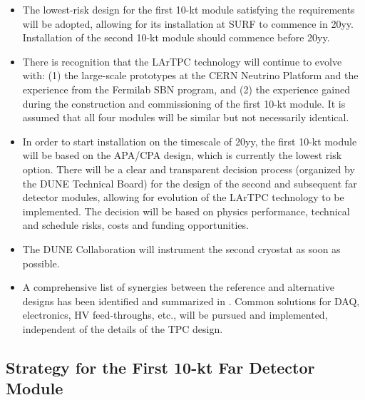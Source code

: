 \begin{itemize}
\item The lowest-risk design for the first 10-kt module satisfying the requirements 
will be adopted, allowing for its installation at SURF to commence in 20yy. %
Installation  of the second 10-kt module should commence before 20yy. %

\item  There is recognition that the LArTPC technology will continue to evolve with: (1) the 
large-scale prototypes at the CERN Neutrino Platform and the experience from the 
Fermilab SBN program, and (2) the experience gained during the construction and 
commissioning of the first 10-kt module. It is assumed that all four modules 
will be similar but not necessarily identical.

\item  In order to start installation on the timescale of 20yy, %
the first  10-kt module will be based on the APA/CPA design, which is currently the lowest
risk option. There will be a clear and transparent decision process (organized by the DUNE 
Technical Board) for the design 
of the second and subsequent far detector modules, allowing for evolution of the 
LArTPC technology to be implemented. The decision will be 
based on physics performance, technical and schedule risks, costs and funding 
opportunities.

\item The DUNE Collaboration will instrument the second cryostat as soon as possible.

\item A comprehensive list of synergies between the reference and alternative designs 
has been identified and summarized in \voldune. Common solutions for DAQ, 
electronics, HV feed-throughs, etc., will be pursued and implemented, independent 
of the details of the TPC design.

\end{itemize}
\subsection{Strategy for the First 10-kt Far Detector Module}
\label{v1ch3:first-fd-mod-strategy}


